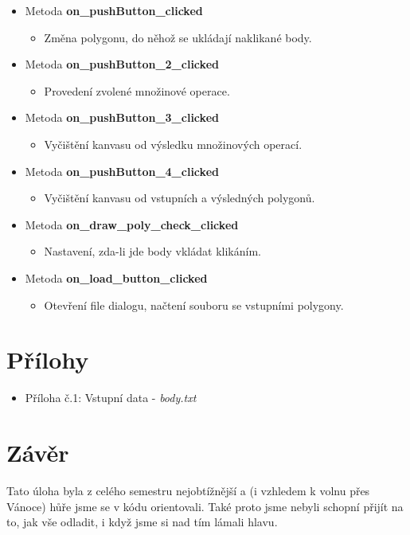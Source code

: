 \documentclass[a4paper, 12pt]{article}
\begin{document}
\begin{itemize}
	\item Metoda \textbf{on\_pushButton\_clicked}
		\begin{itemize}
			\item Změna polygonu, do něhož se ukládají naklikané body.
		\end{itemize}
	\item Metoda \textbf{on\_pushButton\_2\_clicked}
		\begin{itemize}
			\item Provedení zvolené množinové operace.
		\end{itemize}
	\item Metoda \textbf{on\_pushButton\_3\_clicked}
		\begin{itemize}
			\item Vyčištění kanvasu od výsledku množinových operací.
		\end{itemize}
	\item Metoda \textbf{on\_pushButton\_4\_clicked}
		\begin{itemize}
			\item Vyčištění kanvasu od vstupních a výsledných polygonů.
		\end{itemize}
	\item Metoda \textbf{on\_draw\_poly\_check\_clicked}
		\begin{itemize}
			\item Nastavení, zda-li jde body vkládat klikáním.
		\end{itemize}
	\item Metoda \textbf{on\_load\_button\_clicked}
		\begin{itemize}
			\item Otevření file dialogu, načtení souboru se vstupními polygony.
		\end{itemize}
\end{itemize} 

\clearpage

\section{Přílohy}

\begin{itemize}
	\item Příloha č.1: Vstupní data - \textit{body.txt}
\end{itemize}

\section{Závěr}
Tato úloha byla z celého semestru nejobtížnější a (i vzhledem k volnu přes Vánoce) hůře jsme se v kódu orientovali. Také proto jsme nebyli schopní přijít na to, jak vše odladit, i když jsme si nad tím lámali hlavu.
\end{document}

